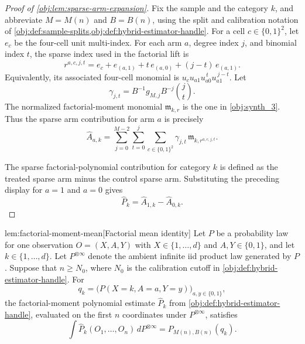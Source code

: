 \documentclass[11pt]{article}
\begin{document}
\begin{proof}[Proof of \cref{obj:lem:sparse-arm-expansion}]
Fix the sample and the category \(k\), and abbreviate \(M=M(n)\) and \(B=B(n)\), using the split and calibration notation of \cref{obj:def:sample-splits,obj:def:hybrid-estimator-handle}.  For a cell \(c\in\{0,1\}^2\), let \(e_c\) be the four-cell unit multi-index.  For each arm \(a\), degree index \(j\), and binomial index \(t\), the sparse index used in the factorial lift is
\[
r^{a,c,j,t}
=
e_c+e_{(a,1)}+t\,e_{(a,0)}+(j-t)\,e_{(a,1)}.
\]
Equivalently, its associated four-cell monomial is \(u_cu_{a1}u_{a0}^{\,t}u_{a1}^{\,j-t}\).  Let
\[
\gamma_{j,t}
=
B^{-1}g_{M,j}B^{-j}\binom jt .
\]
The normalized factorial-moment monomial \(\mathfrak m_{k,r}\) is the one in \cref{obj:synth_3}.  Thus the sparse arm contribution for arm \(a\) is precisely
\[
\widehat A_{a,k}
=
\sum_{j=0}^{M-2}\sum_{t=0}^{j}\sum_{c\in\{0,1\}^2}
\gamma_{j,t}\,
\mathfrak m_{k,r^{a,c,j,t}} .
\]

The sparse factorial-polynomial contribution for category \(k\) is defined as the treated sparse arm minus the control sparse arm.  Substituting the preceding display for \(a=1\) and \(a=0\) gives
\[
\widehat P_k
=
\widehat A_{1,k}-\widehat A_{0,k}.
\]
\end{proof}

\begin{lemmav}{lem:factorial-moment-mean}[Factorial mean identity]
Let \(P\) be a probability law for one observation \(O=(X,A,Y)\) with \(X\in\{1,\ldots,d\}\) and \(A,Y\in\{0,1\}\), and let \(k\in\{1,\ldots,d\}\). Let \(P^{\otimes\infty}\) denote the ambient infinite iid product law generated by \(P\). Suppose that \(n\ge N_0\), where \(N_0\) is the calibration cutoff in \cref{obj:def:hybrid-estimator-handle}. For
\[
q_k=\bigl(P(X=k,A=a,Y=y)\bigr)_{a,y\in\{0,1\}},
\]
the factorial-moment polynomial estimate \(\widehat P_k\) from \cref{obj:def:hybrid-estimator-handle}, evaluated on the first \(n\) coordinates under \(P^{\otimes\infty}\), satisfies
\[
\int \widehat P_k(O_1,\ldots,O_n)\,dP^{\otimes\infty}
=
P_{M(n),B(n)}(q_k).
\]
\end{lemmav}
\end{document}
